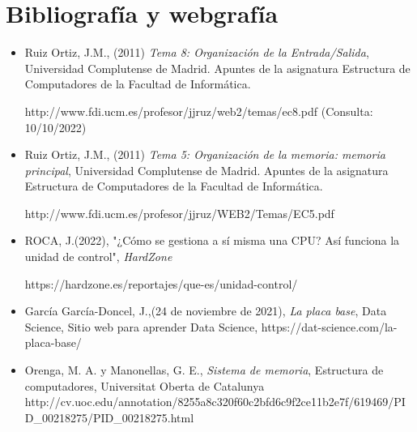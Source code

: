 \documentclass{book}
\begin{document}
\chapter{Bibliografía y webgrafía}

\begin{large}

\begin{itemize}

    \item Ruiz Ortiz, J.M., (2011) \textit{Tema 8: Organización de la Entrada/Salida}, Universidad Complutense de Madrid. Apuntes de la asignatura Estructura de Computadores de la Facultad de Informática. 
    
    http://www.fdi.ucm.es/profesor/jjruz/web2/temas/ec8.pdf (Consulta: 10/10/2022)
    
    \item Ruiz Ortiz, J.M., (2011) \textit{Tema 5: Organización de la memoria: memoria principal}, Universidad Complutense de Madrid. Apuntes de la asignatura Estructura de Computadores de la Facultad de Informática. 
    
    http://www.fdi.ucm.es/profesor/jjruz/WEB2/Temas/EC5.pdf
    
    \item ROCA, J.(2022), "¿Cómo se gestiona a sí misma una CPU? Así funciona la unidad de control", \textit{HardZone}
    
    https://hardzone.es/reportajes/que-es/unidad-control/
    
    \item García García-Doncel, J.,(24 de noviembre de 2021), \textit{La placa base}, Data Science, Sitio web para aprender Data Science, https://dat-science.com/la-placa-base/
    
    \item  Orenga, M. A. y  Manonellas, G. E., \textit{Sistema de memoria}, Estructura de computadores, Universitat Oberta de Catalunya http://cv.uoc.edu/annotation/8255a8c320f60c2bfd6c9f2ce11b2e7f/619469/PID\_00218275/PID\_00218275.html
    
\end{itemize}

\end{large}

\end{document}
